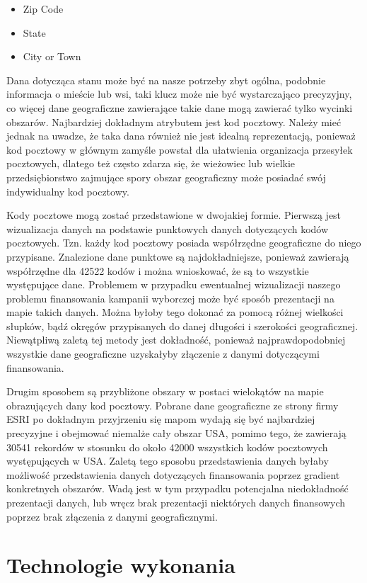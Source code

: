\documentclass[10pt,a4paper]{article}
\begin{document}
\begin{itemize}
\item Zip Code
\item State
\item City or Town
\end{itemize}

Dana dotycząca stanu może być na nasze potrzeby zbyt ogólna, podobnie informacja o mieście lub wsi, taki klucz może nie być wystarczająco precyzyjny, co więcej dane geograficzne zawierające takie dane mogą zawierać tylko wycinki obszarów. Najbardziej dokładnym atrybutem jest kod pocztowy. Należy mieć jednak na uwadze, że taka dana również nie jest idealną reprezentacją, ponieważ kod pocztowy w głównym zamyśle powstał dla ułatwienia organizacja przesyłek pocztowych, dlatego też często zdarza się, że wieżowiec lub wielkie przedsiębiorstwo zajmujące spory obszar geograficzny może posiadać swój indywidualny kod pocztowy. 

Kody pocztowe mogą zostać przedstawione w dwojakiej formie. Pierwszą jest wizualizacja danych na podstawie punktowych danych dotyczących kodów pocztowych. Tzn. każdy kod pocztowy posiada współrzędne geograficzne do niego przypisane. Znalezione dane punktowe są najdokładniejsze, ponieważ zawierają współrzędne dla 42522 kodów i można wnioskować, że są to wszystkie występujące dane. Problemem w przypadku ewentualnej wizualizacji naszego problemu finansowania kampanii wyborczej może być sposób prezentacji na mapie takich danych. Można byłoby tego dokonać za pomocą różnej wielkości słupków, bądź okręgów przypisanych do danej długości i szerokości geograficznej. Niewątpliwą zaletą tej metody jest dokładność, ponieważ najprawdopodobniej wszystkie dane geograficzne uzyskałyby złączenie z danymi dotyczącymi finansowania.

Drugim sposobem są przybliżone obszary w postaci wielokątów na mapie obrazujących dany kod pocztowy. Pobrane dane geograficzne ze strony firmy ESRI po dokładnym przyjrzeniu się mapom wydają się być najbardziej precyzyjne i obejmować niemalże cały obszar USA, pomimo tego, że zawierają 30541 rekordów w stosunku do około 42000 wszystkich kodów pocztowych występujących w USA. Zaletą tego sposobu przedstawienia danych byłaby możliwość przedstawienia danych dotyczących finansowania poprzez gradient konkretnych obszarów. Wadą jest w tym przypadku potencjalna niedokładność prezentacji danych, lub wręcz brak prezentacji niektórych danych finansowych poprzez brak złączenia z danymi geograficznymi.
\section{Technologie wykonania}
\end{document}
